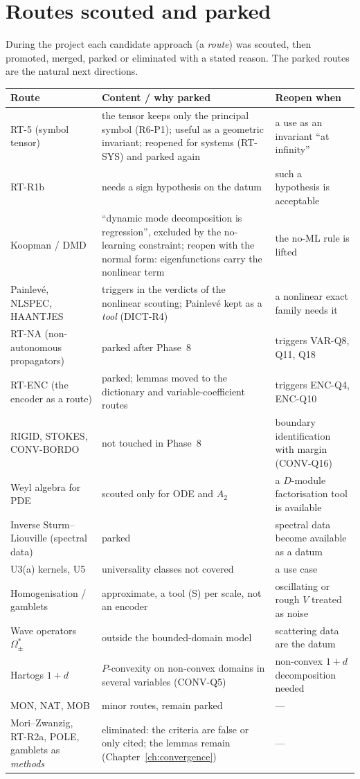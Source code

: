 \section{Routes scouted and parked}

During the project each candidate approach (a \emph{route}) was scouted, then promoted, merged, parked or eliminated with a stated reason. The parked routes are the natural next directions.

\begin{center}\small
\begin{longtable}{@{}L{3.3cm}L{7.0cm}L{4.3cm}@{}}
\toprule
Route & Content / why parked & Reopen when\\\midrule\endhead
RT-5 (symbol tensor) & the tensor keeps only the principal symbol (R6-P1); useful as a geometric invariant; reopened for systems (RT-SYS) and parked again & a use as an invariant ``at infinity''\\
RT-R1b & needs a sign hypothesis on the datum & such a hypothesis is acceptable\\
Koopman / DMD & ``dynamic mode decomposition is regression'', excluded by the no-learning constraint; reopen with the normal form: eigenfunctions carry the nonlinear term & the no-ML rule is lifted\\
Painlev\'e, NLSPEC, HAANTJES & triggers in the verdicts of the nonlinear scouting; Painlev\'e kept as a \emph{tool} (DICT-R4) & a nonlinear exact family needs it\\
RT-NA (non-autonomous propagators) & parked after Phase~8 & triggers VAR-Q8, Q11, Q18\\
RT-ENC (the encoder as a route) & parked; lemmas moved to the dictionary and variable-coefficient routes & triggers ENC-Q4, ENC-Q10\\
RIGID, STOKES, CONV-BORDO & not touched in Phase~8 & boundary identification with margin (CONV-Q16)\\
Weyl algebra for PDE & scouted only for ODE and $A_2$ & a $D$-module factorisation tool is available\\
Inverse Sturm--Liouville (spectral data) & parked & spectral data become available as a datum\\
U3(a) kernels, U5 & universality classes not covered & a use case\\
Homogenisation / gamblets & approximate, a tool (S) per scale, not an encoder & oscillating or rough $V$ treated as noise\\
Wave operators $\Omega_\pm^*$ & outside the bounded-domain model & scattering data are the datum\\
Hartogs $1+d$ & $P$-convexity on non-convex domains in several variables (CONV-Q5) & non-convex $1+d$ decomposition needed\\
MON, NAT, MOB & minor routes, remain parked & ---\\
Mori--Zwanzig, RT-R2a, POLE, gamblets as \emph{methods} & eliminated: the criteria are false or only cited; the lemmas remain (Chapter~\ref{ch:convergence}) & ---\\
\bottomrule
\end{longtable}
\end{center}

